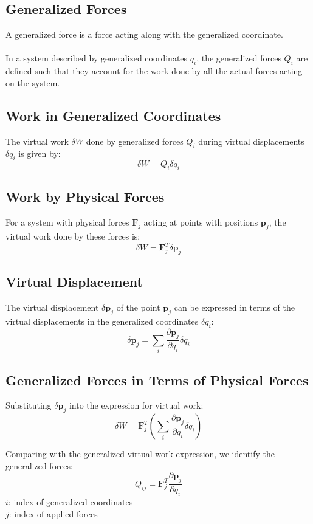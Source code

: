 \subsection{Generalized Forces}
A generalized force is a force acting along with the generalized coordinate.
\\
\\
In a system described by generalized coordinates $q_i$, the generalized forces $Q_i$ are defined such that they account for the work done by all the actual forces acting on the system.
\subsection{Work in Generalized Coordinates}
The virtual work \( \delta W \) done by generalized forces \( Q_i \) during virtual displacements \( \delta q_i \) is given by:
\[
\delta W =  Q_i \delta q_i
\]


\subsection{Work by Physical Forces}
For a system with physical forces \( \mathbf{F}_j \) acting at points with positions \( \mathbf{p}_j \), the virtual work done by these forces is:
\[
\delta W = \mathbf{F}_j^T \delta \mathbf{p}_j
\]


\subsection{Virtual Displacement}
The virtual displacement \( \delta \mathbf{p}_j \) of the point \( \mathbf{p}_j \) can be expressed in terms of the virtual displacements in the generalized coordinates \( \delta q_i \):
\[
\delta \mathbf{p}_j = \sum_{i} \frac{\partial \mathbf{p}_j}{\partial q_i} \delta q_i
\]

\subsection{Generalized Forces in Terms of Physical Forces}
Substituting \( \delta \mathbf{p}_j \) into the expression for virtual work:
\[
\delta W = \mathbf{F}_j^T \left( \sum_{i} \frac{\partial \mathbf{p}_j}{\partial q_i} \delta q_i \right)
\]

Comparing with the generalized virtual work expression, we identify the generalized forces:
\[
Q_{ij} = \mathbf{F}_j^T \frac{\partial \mathbf{p}_j}{\partial q_i}
\]
$i$: index of generalized coordinates 
\\
$j$: index of applied forces
